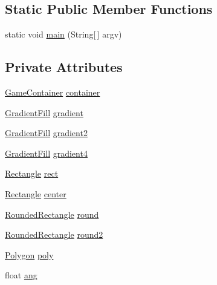 \subsection*{Static Public Member Functions}
\begin{DoxyCompactItemize}
\item 
static void \mbox{\hyperlink{classorg_1_1newdawn_1_1slick_1_1tests_1_1_gradient_test_a7ac85d4e961767d567964885845763be}{main}} (String\mbox{[}$\,$\mbox{]} argv)
\end{DoxyCompactItemize}
\subsection*{Private Attributes}
\begin{DoxyCompactItemize}
\item 
\mbox{\hyperlink{classorg_1_1newdawn_1_1slick_1_1_game_container}{Game\+Container}} \mbox{\hyperlink{classorg_1_1newdawn_1_1slick_1_1tests_1_1_gradient_test_ae50800331ae38b8083556139b8d7d6ef}{container}}
\item 
\mbox{\hyperlink{classorg_1_1newdawn_1_1slick_1_1fills_1_1_gradient_fill}{Gradient\+Fill}} \mbox{\hyperlink{classorg_1_1newdawn_1_1slick_1_1tests_1_1_gradient_test_ab636fdd1b30ccf1fb769abda2629bd6b}{gradient}}
\item 
\mbox{\hyperlink{classorg_1_1newdawn_1_1slick_1_1fills_1_1_gradient_fill}{Gradient\+Fill}} \mbox{\hyperlink{classorg_1_1newdawn_1_1slick_1_1tests_1_1_gradient_test_ad37e6f55ccc424c75329f2d26534a38f}{gradient2}}
\item 
\mbox{\hyperlink{classorg_1_1newdawn_1_1slick_1_1fills_1_1_gradient_fill}{Gradient\+Fill}} \mbox{\hyperlink{classorg_1_1newdawn_1_1slick_1_1tests_1_1_gradient_test_a652eae8fd5c80d91208072726cd97bc0}{gradient4}}
\item 
\mbox{\hyperlink{classorg_1_1newdawn_1_1slick_1_1geom_1_1_rectangle}{Rectangle}} \mbox{\hyperlink{classorg_1_1newdawn_1_1slick_1_1tests_1_1_gradient_test_a92555101fee8481a8c00c3c7de61e503}{rect}}
\item 
\mbox{\hyperlink{classorg_1_1newdawn_1_1slick_1_1geom_1_1_rectangle}{Rectangle}} \mbox{\hyperlink{classorg_1_1newdawn_1_1slick_1_1tests_1_1_gradient_test_a00909b4a7e7123873d9c680e2b22e9a6}{center}}
\item 
\mbox{\hyperlink{classorg_1_1newdawn_1_1slick_1_1geom_1_1_rounded_rectangle}{Rounded\+Rectangle}} \mbox{\hyperlink{classorg_1_1newdawn_1_1slick_1_1tests_1_1_gradient_test_a3a02c8e06a319a501df25117964c614a}{round}}
\item 
\mbox{\hyperlink{classorg_1_1newdawn_1_1slick_1_1geom_1_1_rounded_rectangle}{Rounded\+Rectangle}} \mbox{\hyperlink{classorg_1_1newdawn_1_1slick_1_1tests_1_1_gradient_test_a13d1ad7ef13a55b84d22753c91539a3e}{round2}}
\item 
\mbox{\hyperlink{classorg_1_1newdawn_1_1slick_1_1geom_1_1_polygon}{Polygon}} \mbox{\hyperlink{classorg_1_1newdawn_1_1slick_1_1tests_1_1_gradient_test_acc9d25b05176a1befa9be4af374b4849}{poly}}
\item 
float \mbox{\hyperlink{classorg_1_1newdawn_1_1slick_1_1tests_1_1_gradient_test_ac3493f41dce0f87d86a4a83de31181a3}{ang}}
\end{DoxyCompactItemize}
